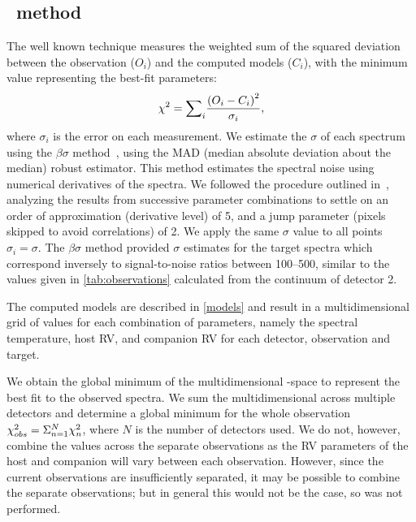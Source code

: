 \subsection{\texorpdfstring{\textchisquared}\ \ method}
\label{subsec:chi2}
The well known \textchisquared{} technique measures the weighted sum of the squared deviation between the observation (\({O}_{i}\)) and the computed models (\(C_{i}\)), with the minimum \textchisquared{} value representing the best-fit parameters:
\[{\chi}^{2} = {\sum}_i \frac{{(O_{i} - C_{i})}^2}{{\sigma}_{i}},\] where \({\sigma}_{i}\) is the error on each measurement.
We estimate the \(\sigma\) of each spectrum using the \(\beta\sigma\) method~\citep{czesla_posteriori_2018}, using the MAD (median absolute deviation about the median) robust estimator. {\red{} This method estimates the spectral noise using numerical derivatives of the spectra.
We followed the procedure outlined in~\citet{czesla_posteriori_2018}, analyzing the results from successive parameter combinations to settle on an order of approximation (derivative level) of 5, and a jump parameter (pixels skipped to avoid correlations) of 2.} We apply the same \(\sigma\) value to all points \({\sigma}_{i} = \sigma\).
The \(\beta\sigma\) method provided \(\sigma\) estimates for the target spectra which correspond inversely to signal-to-noise ratios between 100--500, {\red{} similar to the values given in \cref{tab:observations} calculated from the continuum of detector 2.}

The computed models are described in \cref{models} and result in a multidimensional grid of \textchisquared{} values for each combination of parameters, namely the spectral temperature, host {RV}, and companion {RV} for each detector, observation and target.

We obtain the global minimum of the multidimensional \textchisquared-space to represent the best fit to the observed spectra.
We sum the multidimensional \textchisquared{} across multiple detectors and determine a global minimum \textchisquared{} for the whole observation \({\chi}^{2}_{obs} = \Sigma^{N}_{n=1} {\chi}^{2}_n\), where \(N\) is the number of detectors used.
We do not, however, combine the \textchisquared{} values across the separate observations as the {RV} parameters of the host and companion will vary between each observation.
However, since the current observations are insufficiently separated, it may be possible to combine the separate observations; but in general this would not be the case, so was not performed.


